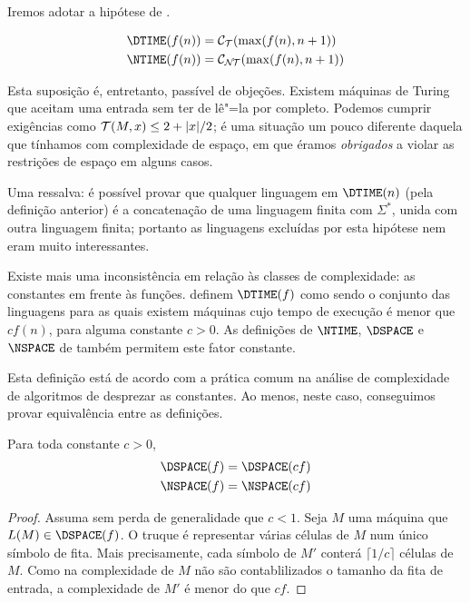 Iremos adotar a hipótese de .
\begin{definition}
    \begin{align*}
        \DTIME(f(n)) &= \mathcal C_\PhiDT(\max(f(n), n+1)) \\
        \NTIME(f(n)) &= \mathcal C_\PhiNT(\max(f(n), n+1))
    \end{align*}
\end{definition}

Esta suposição é,
entretanto,
passível de objeções.
Existem máquinas de Turing
que aceitam uma entrada
sem ter de lê"=la por completo.
Podemos cumprir exigências como
${\mathcal{T}}(M, x) \leq 2 + |x|/2$;
é uma situação um pouco diferente
daquela que tínhamos com complexidade de espaço,
em que éramos \emph{obrigados}
a violar as restrições de espaço
em alguns casos.

Uma ressalva:
é possível provar que
qualquer linguagem em $\DTIME(n)$
(pela definição anterior)
é a concatenação de uma linguagem finita
com $\Sigma^*$,
unida com outra linguagem finita;
portanto as linguagens excluídas por esta hipótese
nem eram muito interessantes.

Existe mais uma inconsistência
em relação às classes de complexidade:
as constantes em frente às funções.
definem $\DTIME(f)$ como sendo o conjunto das linguagens
para as quais existem máquinas cujo tempo de execução
é menor que $c f(n)$, para alguma constante $c > 0$.
As definições de $\NTIME$, $\DSPACE$ e $\NSPACE$
de 
também permitem este fator constante.

Esta definição está de acordo com
a prática comum na análise de complexidade de algoritmos
de desprezar as constantes.
Ao menos,
neste caso,
conseguimos provar equivalência entre as definições.

\begin{theorem}
    Para toda constante $c > 0$,
    \begin{align*}
        \DSPACE(f) & = \DSPACE(cf) \\
        \NSPACE(f) & = \NSPACE(cf)
    \end{align*}
\end{theorem}

\begin{proof}
    Assuma sem perda de generalidade que $c < 1$.
    Seja $M$ uma máquina que $L(M) \in \DSPACE(f)$.
    O truque é representar várias células de $M$
    num único símbolo de fita.
    Mais precisamente,
    cada símbolo de $M'$ conterá
    $\lceil 1/c \rceil$ células de $M$.
    Como na complexidade de $M$
    não são contablilizados o tamanho da fita de entrada,
    a complexidade de $M'$ é menor do que $cf$.
\end{proof}

